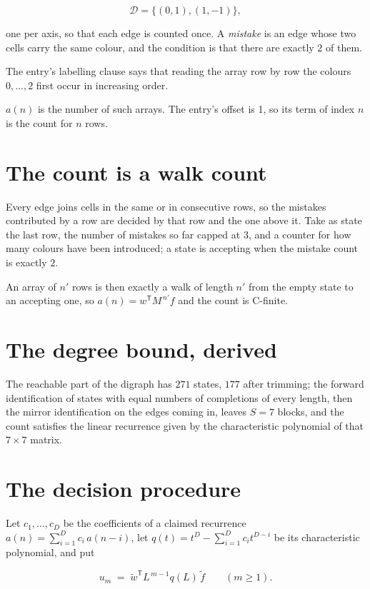\documentclass[11pt]{article}
\theoremstyle{definition}
\begin{document}
\[\mathcal{D} = \{(0,1), (1,-1)\},\]

one per axis, so that each edge is counted once. A {\itshape mistake} is an edge whose two cells carry the same colour, and the condition is that there are exactly $2$ of them.

The entry's labelling clause says that reading the array row by row the colours $0,\dots,2$ first occur in increasing order.

$a(n)$ is the number of such arrays. The entry's offset is 1, so its term of index $n$ is the count for $n$ rows.

\section{The count is a walk count}

Every edge joins cells in the same or in consecutive rows, so the mistakes contributed by a row are decided by that row and the one above it. Take as state the last row, the number of mistakes so far capped at $3$, and a counter for how many colours have been introduced; a state is accepting when the mistake count is exactly $2$.

An array of $n'$ rows is then exactly a walk of length $n'$ from the empty state to an accepting one, so $a(n) = w^{\mathsf T}M^{\,n'}f$ and the count is C-finite.

\section{The degree bound, derived}

The reachable part of the digraph has $271$ states, $177$ after trimming; the forward identification of states with equal numbers of completions of every length, then the mirror identification on the edges coming in, leaves $S = 7$ blocks, and the count satisfies the linear recurrence given by the characteristic polynomial of that $7\times7$ matrix.

\section{The decision procedure}

Let $c_1,\dots,c_D$ be the coefficients of a claimed recurrence $a(n) = \sum_{i=1}^{D} c_i\,a(n-i)$, let $q(t) = t^{D} - \sum_{i=1}^{D} c_i t^{D-i}$ be its characteristic polynomial, and put

\[u_m \;=\; \tilde w^{\mathsf T} L^{\,m-1} q(L)\,\tilde f \qquad (m \ge 1).\]
\end{document}
